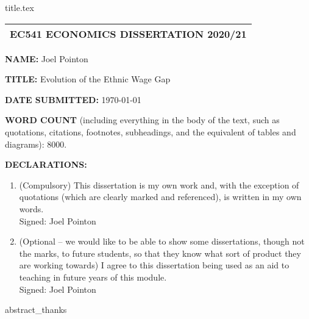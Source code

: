 \documentclass[openany,a4paper,12pt]{book}
\begin{document}
\pagestyle{headings}
\pagestyle{fancy}
\fancyfoot[R]{\thepage}

\frontmatter
{title.tex}
\clearpage
\begin{center}
         \begin{tabular}{| c |} 
         \hline
         \textbf{EC541 ECONOMICS DISSERTATION 2020/21} \\
         \hline
        \end{tabular}
\end{center}
\vspace{15pt}

\indent \textbf{NAME:} Joel Pointon
\vspace{30pt}

\textbf{TITLE:} Evolution of the Ethnic Wage Gap
\vspace{30pt}

\textbf{DATE SUBMITTED:} \today
\vspace{30pt}

\textbf{WORD COUNT} (including everything in the body of the text, such as quotations, citations, footnotes, subheadings, and the equivalent of tables and diagrams): 8000.
\vspace{30pt}

\textbf{DECLARATIONS:}
\begin{enumerate}
    \item (Compulsory) This dissertation is my own work and, with the exception of quotations (which are clearly marked and referenced), is written in my own words. \\Signed: Joel Pointon
    \item (Optional – we would like to be able to show some dissertations, though not the marks, to future students, so that they know what sort of product they are working towards) I agree to this dissertation being used as an aid to teaching in future years of this module. \\Signed: Joel Pointon
\end{enumerate}
{abstract_thanks}
\tableofcontents

\newpage
\thispagestyle{empty}
\listoftables
\listoffigures

\end{document}
